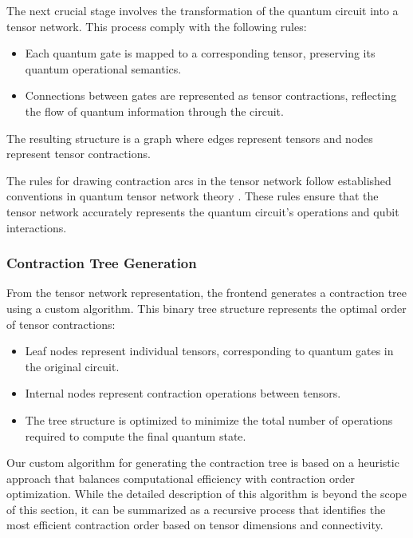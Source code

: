 \documentclass[12pt,oneside,a4paper]{article}
\begin{document}
The next crucial stage involves the transformation of the quantum circuit into a tensor network. This process comply with the following rules:

\begin{itemize}
    \item Each quantum gate is mapped to a corresponding tensor, preserving its quantum operational semantics.
    \item Connections between gates are represented as tensor contractions, reflecting the flow of quantum information through the circuit.
\end{itemize}

The resulting structure is a graph where edges represent tensors and nodes represent tensor contractions.

The rules for drawing contraction arcs in the tensor network follow established conventions in quantum tensor network theory \cite{biamonte2017tensornetworksnutshell}. These rules ensure that the tensor network accurately represents the quantum circuit's operations and qubit interactions.

\subsubsection{Contraction Tree Generation}

From the tensor network representation, the frontend generates a contraction tree using a custom algorithm. This binary tree structure represents the optimal order of tensor contractions:

\begin{itemize}
    \item Leaf nodes represent individual tensors, corresponding to quantum gates in the original circuit.
    \item Internal nodes represent contraction operations between tensors.
    \item The tree structure is optimized to minimize the total number of operations required to compute the final quantum state.
\end{itemize}

Our custom algorithm for generating the contraction tree is based on a heuristic approach that balances computational efficiency with contraction order optimization. While the detailed description of this algorithm is beyond the scope of this section, it can be summarized as a recursive process that identifies the most efficient contraction order based on tensor dimensions and connectivity.
\end{document}
